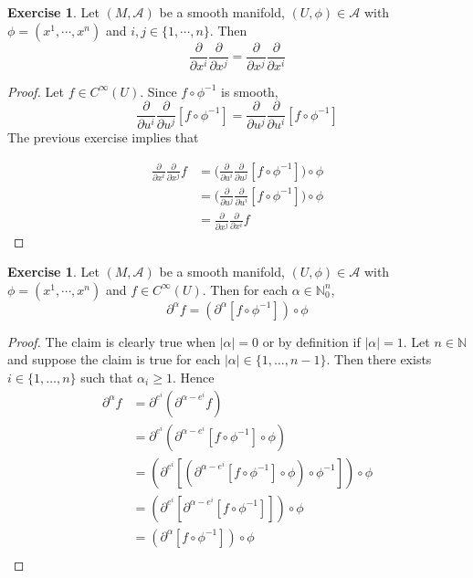 \documentclass{book}
\theoremstyle{definition}
\newtheorem{ex}[definition]{Exercise}
\newcommand{\al}{\alpha}
\newcommand{\N}{\mathbb{N}}
\newcommand{\MA}{\mathcal{A}}
\DeclareMathOperator*{\0}{\mbf{0}}
\DeclareMathOperator*{\1}{\mbf{1}}
\newcommand{\p}{\partial}
\begin{document}
	\begin{ex}
	Let $(M, \MA)$ be a smooth manifold, $(U, \phi) \in \MA$ with $\phi = (x^1, \cdots, x^n)$ and $i,j \in \{1, \cdots, n\}$. Then 
	\begin{equation*}
	\frac{\p}{\p x^i}\frac{\p}{\p x^j} =\frac{\p}{\p x^j}\frac{\p}{\p x^i}
	\end{equation*}
	\end{ex}
	
	\begin{proof}
	Let $f \in C^{\infty}(U)$. Since $f \circ \phi^{-1}$ is smooth, $$\frac{\p}{\p u^i} \frac{\p}{\p u^j} [f \circ \phi^{-1}] = \frac{\p}{\p u^j} \frac{\p}{\p u^i} [f \circ \phi^{-1}] $$
	The previous exercise implies that 
	
	\begin{align*}
	\frac{\p}{\p x^i}\frac{\p}{\p x^j}f 
	&= \bigg( \frac{\p}{\p u^i} \frac{\p}{\p u^j} [f \circ \phi^{-1}]  \bigg) \circ \phi \\
	&= \bigg( \frac{\p}{\p u^j} \frac{\p}{\p u^i} [f \circ \phi^{-1}]  \bigg) \circ \phi \\
	&=\frac{\p}{\p x^j}\frac{\p}{\p x^i}f 
	\end{align*}
	\end{proof}
	
	\begin{ex}
	Let $(M, \MA)$ be a smooth manifold, $(U, \phi) \in \MA$ with $\phi = (x^1, \cdots, x^n)$ and $f \in C^{\infty}(U)$. Then for each $\al \in \N_0^n$, $$\p^{\al} f = (\p^{\al}[ f \circ \phi^{-1}] ) \circ \phi$$
	\end{ex}	
	
	\begin{proof}
	The claim is clearly true when $|\al| =0$ or by definition if $|\al| = 1$. Let $n \in \N$ and suppose the claim is true for each $|\al| \in \{1, \ldots, n-1 \}$. Then there exists $i \in \{1, \ldots, n\}$ such that $\al_i \geq 1$. Hence 
	\begin{align*}
	\p^{\al}f 
	&= \p^{e^i} (\p^{\al - e^i} f) \\
	&= \p^{e^i} (\p^{\al - e^i}[ f \circ \phi^{-1}] \circ \phi) \\
	&= (\p^{e^i} [(\p^{\al - e^i}[ f \circ \phi^{-1}] \circ \phi) \circ \phi^{-1} ]) \circ \phi\\
	&= (\p^{e^i} [\p^{\al - e^i}[ f \circ \phi^{-1}]] )\circ \phi\\
	&= (\p^{\al}[ f \circ \phi^{-1}] )\circ \phi\\
	\end{align*}
	\end{proof}
	
\end{document}
